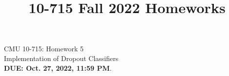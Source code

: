 \documentclass{article}
\title{10-715 Fall 2022 Homeworks}
\begin{document}

\begin{center}
{\Large CMU 10-715: Homework 5}\\
Implementation of Dropout Classifiers \\
{\bf DUE: Oct. 27, 2022, 11:59 PM}.\\
\end{center}

\end{document}
